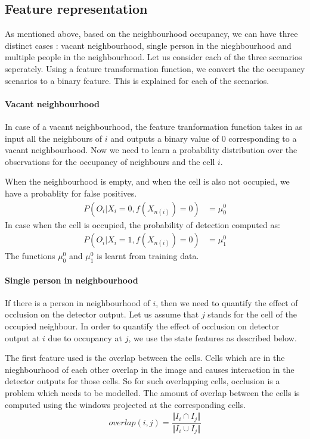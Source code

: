 \documentclass[10pt,twocolumn,letterpaper]{article}
\begin{document}
\subsection{Feature representation}

As mentioned above, based on the neighbourhood occupancy, we can have three distinct cases : vacant neighbourhood, single person in the nieghbourhood and multiple people in the neighbourhood. Let us consider each of the three scenarios seperately.
Using a feature transformation function, we convert the the occupancy scenarios to a binary feature. This is explained for each of the scenarios.

\paragraph{Vacant neighbourhood} 
In case of a vacant neighbourhood, the feature tranformation function  takes in as input all the neighbours of $i$ and outputs a binary value of 0 corresponding to a vacant neighbourhood.
Now we need to learn a probability distribution over the observations for the occupancy of neighbours and the cell $i$.

When the neighbourhood is empty, and when the cell is also not occupied, we have a probablity for false positives.
\begin{align}
 P(O_{i} |X_{i}=0 ,f(X_{n(i)}) =0)  &=\mu^{0}_{0}
\end{align}
In case when the cell is occupied, the probability of detection computed as:
\begin{align}
 P(O_{i} |X_{i}=1 ,f(X_{n(i)}) =0)  &=\mu^{0}_{1}
\end{align}
The functions $ \mu^{0}_{0} $  and $ \mu^{0}_{1} $ is learnt from training data.
\paragraph{Single person in neighbourhood}
If there is a person in neighbourhood of $i$, then we need to quantify the effect of occlusion on the detector output. Let us assume that $j$ stands for the cell of the occupied neighbour.  In order to quantify the effect of occlusion on detector output at $i$ due to  occupancy at $j$, we use the state features as described below.

The first feature used is the overlap between the cells. Cells which are in the nieghbourhood of each other overlap in the image and causes interaction in the detector outputs for those cells. So for such overlapping cells, occlusion is a problem which needs to be modelled. The amount of overlap between the cells is computed using the windows projected at the corresponding cells. 
\begin{align}
overlap(i,j) = \dfrac{\Vert I_{i} \cap I_{j} \Vert}{\Vert I_{i} \cup I_{j} \Vert}
\end{align}
\end{document}
